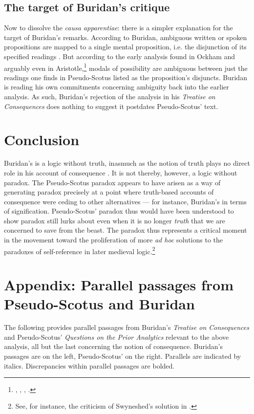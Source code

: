 	\subsection{The target of Buridan's critique}
	
	Now to dissolve the \textit{causa apparentiae}: there is a simpler explanation for the target of Buridan's remarks. According to Buridan, ambiguous written or spoken propositions are mapped to a single mental proposition, i.e. the disjunction of its specified readings \cite[sec. 3. 2]{BuridanQE}. But according to the early analysis found in Ockham and arguably even in Aristotle,\footnote{\cite[II. 25, pp. 330-332]{OckhamSL}, \cite{PriestRead1981}, \cite[I. 19, p. 32B.25-32]{AristotlePrA}, \cite[pp. 243-245]{Johnston2015}.} modals of possibility are ambiguous between just the readings one finds in Pseudo-Scotus listed as the proposition's disjuncts. Buridan is reading his own commitments concerning ambiguity back into the earlier analysis. As such, Buridan's rejection of the analysis in his \textit{Treatise on Consequences} does nothing to suggest it postdates Pseudo-Scotus' text.
	\section{Conclusion}
	Buridan's is a logic without truth, inasmuch as the notion of truth plays no direct role in his account of consequence \cite{Klima2008}. It is not thereby, however, a logic without paradox. The Pseudo-Scotus paradox appears to have arisen as a way of generating paradox precisely at a point where truth-based accounts of consequence were ceding to other alternatives --- for instance, Buridan's in terms of signification. Pseudo-Scotus' paradox thus would have been understood to show paradox still lurks about even when it is no longer \textit{truth} that we are concerned to save from the beast. The paradox thus represents a critical moment in the movement toward the proliferation of more \textit{ad hoc} solutions to the paradoxes of self-reference in later medieval logic.\footnote{See, for instance, the criticism of Swyneshed's solution in \cite{Read2016}.}
	\section[Appendix: parallel passages]{Appendix: Parallel passages from Pseudo-Scotus and Buridan}
	The following provides parallel passages from Buridan's \textit{Treatise on Consequences} and Pseudo-Scotus' \textit{Questions on the Prior Analytics} relevant to the above analysis, all but the last concerning the notion of consequence. Buridan's passages are on the left, Pseudo-Scotus' on the right. Parallels are indicated by italics. Discrepancies within parallel passages are bolded.
